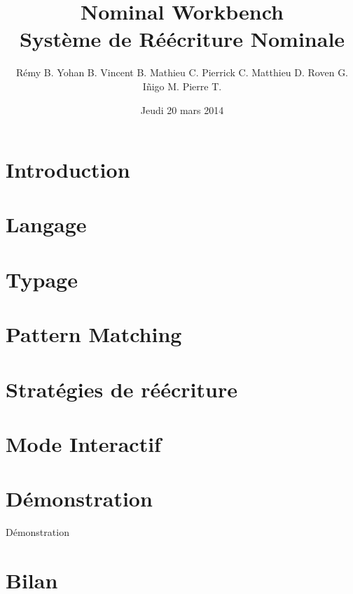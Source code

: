 \documentclass[xcolor=dvipsnames]{beamer}
\title[Nominal Workbench]{Nominal Workbench\\Système de Réécriture Nominale}
\author[\'Equipe NoWork]{Rémy B. Yohan B. Vincent B. Mathieu C. Pierrick C. Matthieu D. Roven G. I\~nigo M. Pierre T.}
\institute[UPMC]{Université Pierre et Marie Curie}
\date{Jeudi 20 mars 2014}
\begin{document}
\begin{frame}
\titlepage
\end{frame}


\section{Introduction}


\section{Langage}


\section{Typage}


\section{Pattern Matching}


\section{Stratégies de réécriture}


\section{Mode Interactif}


\section{Démonstration}

\begin{frame}
\begin{center}
\huge{Démonstration}
\end{center}
\end{frame}


\section{Bilan}

\end{document}

